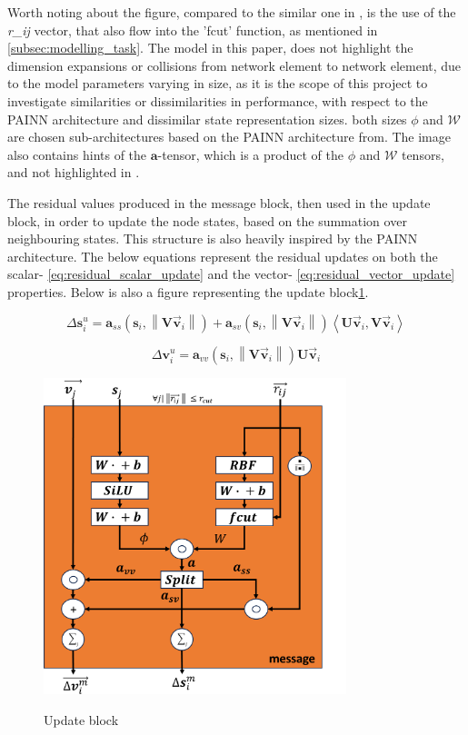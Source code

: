 Worth noting about the figure, compared to the similar one in \cite{PAINN}, is the use of the \textit{r\_ij} vector, that also flow into
the 'fcut' function, as mentioned in \ref{subsec:modelling_task}. The model in this paper, does not highlight the dimension expansions
or collisions from network element to network element, due to the model parameters varying in size, as it is the scope of this project
to investigate similarities or dissimilarities in performance, with respect to the PAINN architecture and dissimilar state representation
sizes. both sizes $\phi$ and $\mathcal{W}$ are chosen sub-architectures based on the PAINN architecture from\cite{PAINN}. The image
also contains hints of the $\mathbf{a}$-tensor, which is a product of the $\phi$ and $\mathcal{W}$ tensors, and not highlighted in \cite{PAINN}.

The residual values produced in the message block, then used in the update block, in order to update the node states,
based on the summation over neighbouring states.
This structure is also heavily inspired by the PAINN architecture\cite{PAINN}. The below equations represent the residual updates
on both the scalar- \ref{eq:residual_scalar_update} and the vector- \ref{eq:residual_vector_update} properties. Below is also
a figure representing the update block\ref{img:update_block}.

\begin{equation}\label{eq:residual_scalar_update}
    \Delta \mathbf{s}_{i}^{u}= \mathbf{a}_{ss} \left ( \mathbf{s}_{i}, \left \| \mathbf{V}\vec{\mathbf{v}}_{i} \right \| \right ) + \mathbf{a}_{sv} \left ( \mathbf{s}_{i}, \left \| \mathbf{V}\vec{\mathbf{v}}_{i} \right \| \right ) \left \langle \mathbf{U} \vec{\mathbf{v}}_{i}, \mathbf{V} \vec{\mathbf{v}}_{i} \right \rangle
\end{equation}

\begin{equation}\label{eq:residual_vector_update}
    \Delta \mathbf{v}_{i}^{u}= \mathbf{a}_{vv} \left ( \mathbf{s}_{i}, \left \| \mathbf{V}\vec{\mathbf{v}}_{i} \right \| \right ) \mathbf{U}\vec{\mathbf{v}}_{i}
\end{equation}

\begin{figure}[H]
    \caption{Update block}
    \centering\label{img:update_block}
    \includegraphics[width=250pt]{Images/Method/message_block.png}
\end{figure}

